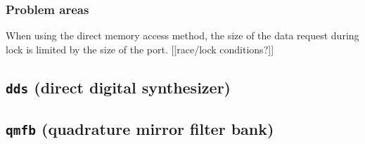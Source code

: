 \subsubsection{Problem areas}
When using the direct memory access method, the size of the data request
during lock is limited by the size of the port.
[[race/lock conditions?]]


%
%

\subsection{{\tt dds} (direct digital synthesizer)}

\subsection{{\tt qmfb} (quadrature mirror filter bank)}

